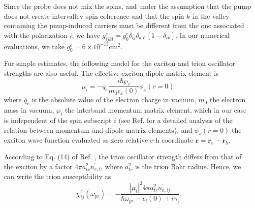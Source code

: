 \documentclass[aps,prb,superscriptaddress,letterpaper,amsmath,amssymb,twocolumn,preprintnumbers]{revtex4}
\begin{document}
Since the probe does not mix the spins, and under the assumption that the pump
does not create intervalley spin coherence
and that the spin $k$ in the valley containing the pump-induced carriers must be different from the one associated
with the polarization $i$,
we have $g_{ijkl}^{e}=g_{0}%
^{e}\delta_{ij}\delta_{k\ell}[1-\delta_{ik}]$. In our numerical evaluations,
we take $g_{0}^{e}=6\times10^{-13}$cm$^{2}$.


For simple estimates, the following model for the exciton and trion oscillator
strengths are also useful. The effective exciton dipole matrix element is%
\begin{equation}
\mu_{i}=-q_{e}\frac{i\hbar\wp_{i}}{m_{0}\epsilon_{x}(0)}\phi_{x}(r=0)
\label{eq:mu-i-exciton}%
\end{equation}
where $q_{e}$ is the absolute value of the electron charge in vacuum, $m_{0}$
the electron mass in vacuum, $\wp_{i}$ the interband momentum matrix element,
which in our case is independent of the spin subscript $i$
(see Ref.  for a detailed analysis of the
relation between momentum and dipole matrix elements),
and $\phi
_{x}(r=0)$ the exciton wave function evaluated as zero relative e-h coordinate
$\mathbf{r}=\mathbf{r}_{e}-\mathbf{r}_{h}$.


According to Eq. (14) of Ref. , the trion oscillator strength differs from that of the exciton by a factor
$4 \pi a^2_{tr} n_{e,i}^{\prime}$, where $a^2_{tr}$ is the trion Bohr radius.
Hence, we can write the trion susceptibility as
\begin{equation}
\chi_{ij}^{t}(\omega_{pr})=-\frac{
|\mu_{i}|^2  4 \pi a^2_{tr}
n_{e,ij}^{\prime}%
}{\hbar\omega_{pr}-\epsilon_{t}(0)+i\gamma_{t}}
\label{eq:chi-trion-Glazov}%
\end{equation}
\end{document}
